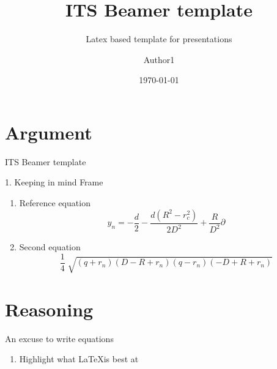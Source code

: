 \documentclass[aspectratio=169, 22pt]{beamer}
\title{ITS Beamer template}
\subtitle{Latex based template for presentations}
\date{\today}
\author[Author]{Author1}
\begin{document}
\begin{frame}
  \titlepage{}
\end{frame}

\section{Argument}

\begin{frame}{ITS Beamer template}
  \begin{block}{1. Keeping in mind}
    Frame
  \end{block}

  \begin{enumerate}
    \item<1-> Reference equation
      \begin{equation}
        y_n=-\frac{d}{2}-\frac{d(R^2 - r_c^2)}{2D^2}+\frac{R}{D^2}\partial
      \end{equation}
    \item<2-> Second equation
      \begin{equation}
        \frac{1}{4} \sqrt[]{(q+r_n)(D-R+r_n)(q-r_n)(-D+R+r_n)}
      \end{equation}
  \end{enumerate}
\end{frame}

\section{Reasoning}

\begin{frame}{An excuse to write equations}
  \begin{enumerate}
    \item Highlight what \LaTeX is best at
  \end{enumerate}
\end{frame}
\end{document}
